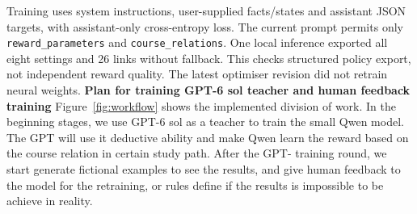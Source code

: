 \documentclass{article}
\begin{document}
Training uses system instructions, user-supplied facts/states and assistant JSON targets, with assistant-only cross-entropy loss. The current prompt permits only \texttt{reward\_parameters} and \texttt{course\_relations}. One local inference exported all eight settings and 26 links without fallback. This checks structured policy export, not independent reward quality. The latest optimiser revision did not retrain neural weights.
\begingroup\setlength{\parskip}{3pt}\setlength{\intextsep}{6pt}
\textbf{Plan for training GPT-6 sol teacher and human feedback training} Figure~\ref{fig:workflow} shows the implemented division of work. In the beginning stages, we use GPT-6 sol as a teacher to train the small Qwen model. The GPT will use it deductive ability and make Qwen learn the reward based on the course relation in certain study path. After the GPT- training round, we start generate fictional examples to see the results, and give human feedback to the model for the retraining, or rules define if the results is impossible to be achieve in reality.\\
\end{document}
